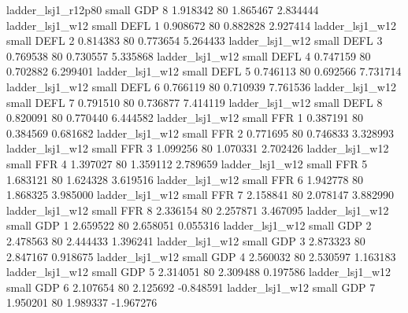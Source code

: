       ladder_lsj1_r12p80      small      GDP                 8 1.918342 80       1.865467           2.834444
         ladder_lsj1_w12      small     DEFL                 1 0.908672 80       0.882828           2.927414
         ladder_lsj1_w12      small     DEFL                 2 0.814383 80       0.773654           5.264433
         ladder_lsj1_w12      small     DEFL                 3 0.769538 80       0.730557           5.335868
         ladder_lsj1_w12      small     DEFL                 4 0.747159 80       0.702882           6.299401
         ladder_lsj1_w12      small     DEFL                 5 0.746113 80       0.692566           7.731714
         ladder_lsj1_w12      small     DEFL                 6 0.766119 80       0.710939           7.761536
         ladder_lsj1_w12      small     DEFL                 7 0.791510 80       0.736877           7.414119
         ladder_lsj1_w12      small     DEFL                 8 0.820091 80       0.770440           6.444582
         ladder_lsj1_w12      small      FFR                 1 0.387191 80       0.384569           0.681682
         ladder_lsj1_w12      small      FFR                 2 0.771695 80       0.746833           3.328993
         ladder_lsj1_w12      small      FFR                 3 1.099256 80       1.070331           2.702426
         ladder_lsj1_w12      small      FFR                 4 1.397027 80       1.359112           2.789659
         ladder_lsj1_w12      small      FFR                 5 1.683121 80       1.624328           3.619516
         ladder_lsj1_w12      small      FFR                 6 1.942778 80       1.868325           3.985000
         ladder_lsj1_w12      small      FFR                 7 2.158841 80       2.078147           3.882990
         ladder_lsj1_w12      small      FFR                 8 2.336154 80       2.257871           3.467095
         ladder_lsj1_w12      small      GDP                 1 2.659522 80       2.658051           0.055316
         ladder_lsj1_w12      small      GDP                 2 2.478563 80       2.444433           1.396241
         ladder_lsj1_w12      small      GDP                 3 2.873323 80       2.847167           0.918675
         ladder_lsj1_w12      small      GDP                 4 2.560032 80       2.530597           1.163183
         ladder_lsj1_w12      small      GDP                 5 2.314051 80       2.309488           0.197586
         ladder_lsj1_w12      small      GDP                 6 2.107654 80       2.125692          -0.848591
         ladder_lsj1_w12      small      GDP                 7 1.950201 80       1.989337          -1.967276
